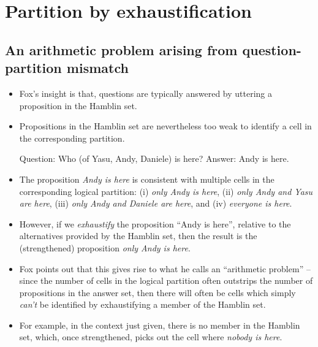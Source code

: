\documentclass[portrait,cronos,paper=letter]{ling-handout}
\begin{document}
\section{Partition by exhaustification}

\subsection{An arithmetic problem arising from question-partition mismatch}

\begin{itemize}

    \item Fox's insight is that, questions are typically answered by uttering a
    proposition in the Hamblin set.

    \item Propositions in the Hamblin set are nevertheless too weak to identify a cell in the
    corresponding partition.

    \pex
    \a Question: Who (of Yasu, Andy, Daniele) is here?
    \a Answer: Andy is here.
    \xe

    \item The proposition \textit{Andy is here} is consistent with multiple cells in
    the corresponding logical partition: (i) \textit{only Andy is here}, (ii) \textit{only
    Andy and Yasu are here}, (iii) \textit{only Andy and Daniele are here}, and (iv)
    \textit{everyone is here}.

    \item However, if we \textit{exhaustify} the proposition \enquote{Andy is
    here}, relative to the alternatives provided by the Hamblin set, then the
    result is the (strengthened) proposition \textit{only Andy is here}.

    \item Fox points out that this gives rise to what he calls an
    \enquote{arithmetic problem} -- since the number of cells in the
    logical partition often outstrips the number of propositions in the answer
    set, then there will often be cells which simply \textit{can't} be
    identified by exhaustifying a member of the Hamblin set.

    \item For example, in the context just given, there is no member in the
    Hamblin set, which, once strengthened, picks out the cell where
    \textit{nobody is here}.

\end{itemize}
\end{document}
